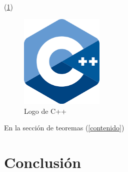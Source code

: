 \documentclass{article}
\begin{document}
 
 (\ref{fig:cpplogo})
 
 
\begin{figure}[h]
\includegraphics[width=4cm]{cpplogo.png}
\centering
\caption{Logo de C++}
\label{fig:cpplogo}
\end{figure}

En la sección de teoremas (\ref{contenido})

\section{Conclusión} \label{conclulsion}



\end{document}
